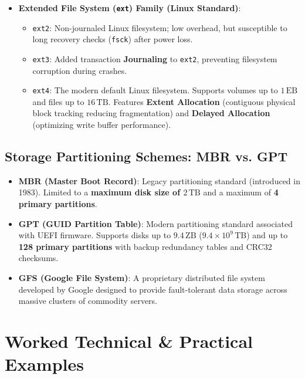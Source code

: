 \begin{itemize}[leftmargin=1.5em]
    \item \textbf{Extended File System (\texttt{ext}) Family (Linux Standard)}:
    \begin{itemize}
        \item \texttt{ext2}: Non-journaled Linux filesystem; low overhead, but susceptible to long recovery checks (\texttt{fsck}) after power loss.
        \item \texttt{ext3}: Added transaction \textbf{Journaling} to \texttt{ext2}, preventing filesystem corruption during crashes.
        \item \texttt{ext4}: The modern default Linux filesystem. Supports volumes up to $1\,\text{EB}$ and files up to $16\,\text{TB}$. Features \textbf{Extent Allocation} (contiguous physical block tracking reducing fragmentation) and \textbf{Delayed Allocation} (optimizing write buffer performance).
    \end{itemize}
\end{itemize}

\subsection{Storage Partitioning Schemes: MBR vs. GPT}
\begin{itemize}[leftmargin=1.5em]
    \item \textbf{MBR (Master Boot Record)}: Legacy partitioning standard (introduced in 1983). Limited to a \textbf{maximum disk size of $2\,\text{TB}$} and a maximum of \textbf{4 primary partitions}.
    \item \textbf{GPT (GUID Partition Table)}: Modern partitioning standard associated with UEFI firmware. Supports disks up to \textbf{$9.4\,\text{ZB}$} ($9.4 \times 10^9\,\text{TB}$) and up to \textbf{128 primary partitions} with backup redundancy tables and CRC32 checksums.
    \item \textbf{GFS (Google File System)}: A proprietary distributed file system developed by Google designed to provide fault-tolerant data storage across massive clusters of commodity servers.
\end{itemize}

\section{Worked Technical \& Practical Examples}

